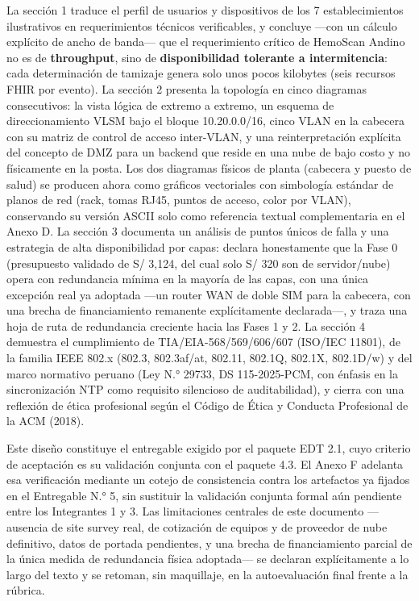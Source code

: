 \documentclass[11pt,a4paper]{article}
\begin{document}
La sección 1 traduce el perfil de usuarios y dispositivos de los 7 establecimientos ilustrativos en requerimientos técnicos verificables, y concluye ---con un cálculo explícito de ancho de banda--- que el requerimiento crítico de HemoScan Andino no es de \textbf{throughput}, sino de \textbf{disponibilidad tolerante a intermitencia}: cada determinación de tamizaje genera solo unos pocos kilobytes (seis recursos FHIR por evento). La sección 2 presenta la topología en cinco diagramas consecutivos: la vista lógica de extremo a extremo, un esquema de direccionamiento VLSM bajo el bloque 10.20.0.0/16, cinco VLAN en la cabecera con su matriz de control de acceso inter-VLAN, y una reinterpretación explícita del concepto de DMZ para un backend que reside en una nube de bajo costo y no físicamente en la posta. Los dos diagramas físicos de planta (cabecera y puesto de salud) se producen ahora como gráficos vectoriales con simbología estándar de planos de red (rack, tomas RJ45, puntos de acceso, color por VLAN), conservando su versión ASCII solo como referencia textual complementaria en el Anexo D. La sección 3 documenta un análisis de puntos únicos de falla y una estrategia de alta disponibilidad por capas: declara honestamente que la Fase 0 (presupuesto validado de S/ 3,124, del cual solo S/ 320 son de servidor/nube) opera con redundancia mínima en la mayoría de las capas, con una única excepción real ya adoptada ---un router WAN de doble SIM para la cabecera, con una brecha de financiamiento remanente explícitamente declarada---, y traza una hoja de ruta de redundancia creciente hacia las Fases 1 y 2. La sección 4 demuestra el cumplimiento de TIA/EIA-568/569/606/607 (ISO/IEC 11801), de la familia IEEE 802.x (802.3, 802.3af/at, 802.11, 802.1Q, 802.1X, 802.1D/w) y del marco normativo peruano (Ley N.° 29733, DS 115-2025-PCM, con énfasis en la sincronización NTP como requisito silencioso de auditabilidad), y cierra con una reflexión de ética profesional según el Código de Ética y Conducta Profesional de la ACM (2018).

Este diseño constituye el entregable exigido por el paquete EDT 2.1, cuyo criterio de aceptación es su validación conjunta con el paquete 4.3. El Anexo F adelanta esa verificación mediante un cotejo de consistencia contra los artefactos ya fijados en el Entregable N.° 5, sin sustituir la validación conjunta formal aún pendiente entre los Integrantes 1 y 3. Las limitaciones centrales de este documento ---ausencia de site survey real, de cotización de equipos y de proveedor de nube definitivo, datos de portada pendientes, y una brecha de financiamiento parcial de la única medida de redundancia física adoptada--- se declaran explícitamente a lo largo del texto y se retoman, sin maquillaje, en la autoevaluación final frente a la rúbrica.
\end{document}
